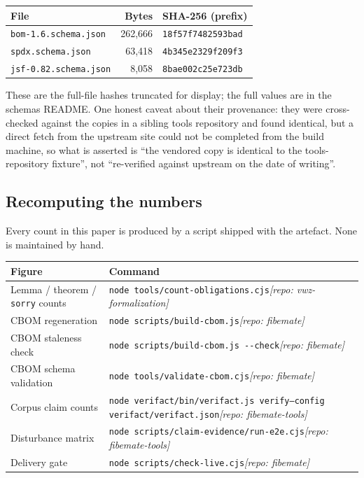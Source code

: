 \begin{center}
\begin{tabular}{@{}lrl@{}}
\toprule
File & Bytes & SHA-256 (prefix) \\
\midrule
\texttt{bom-1.6.schema.json} & 262{,}666 & \texttt{18f57f7482593bad} \\
\texttt{spdx.schema.json} & 63{,}418 & \texttt{4b345e2329f209f3} \\
\texttt{jsf-0.82.schema.json} & 8{,}058 & \texttt{8bae002c25e723db} \\
\bottomrule
\end{tabular}
\end{center}

These are the full-file hashes truncated for display; the full values are in the
schemas README. One honest caveat about their provenance: they were
cross-checked against the copies in a sibling tools repository and found
identical, but a direct fetch from the upstream site could not be completed from
the build machine, so what is asserted is ``the vendored copy is identical to
the tools-repository fixture'', not ``re-verified against upstream on the date of
writing''.

\subsection{Recomputing the numbers}

Every count in this paper is produced by a script shipped with the artefact.
None is maintained by hand.

\begin{center}
\begin{tabular}{@{}l>{\raggedright\arraybackslash}p{}@{}}
\toprule
Figure & Command \\
\midrule
Lemma / theorem / \texttt{sorry} counts & \texttt{node tools/count-obligations.cjs}\newline\textit{[repo: vwz-formalization]} \\
CBOM regeneration & \texttt{node scripts/build-cbom.js}\newline\textit{[repo: fibemate]} \\
CBOM staleness check & \texttt{node scripts/build-cbom.js -{}-check}\newline\textit{[repo: fibemate]} \\
CBOM schema validation & \texttt{node tools/validate-cbom.cjs}\newline\textit{[repo: fibemate]} \\
Corpus claim counts & \texttt{node verifact/bin/verifact.js verify}\newline\texttt{--config verifact/verifact.json}\newline\textit{[repo: fibemate-tools]} \\
Disturbance matrix & \texttt{node scripts/claim-evidence/run-e2e.cjs}\newline\textit{[repo: fibemate-tools]} \\
Delivery gate & \texttt{node scripts/check-live.cjs}\newline\textit{[repo: fibemate]} \\
\bottomrule
\end{tabular}
\end{center}

